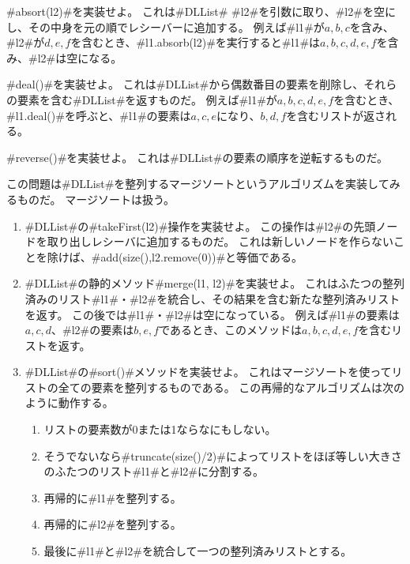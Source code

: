 \begin{exc}
  #absort(l2)#を実装せよ。
  これは#DLList# #l2#を引数に取り、#l2#を空にし、その中身を元の順でレシーバーに追加する。
  例えば#l1#が$a,b,c$を含み、#l2#が$d,e,f$を含むとき、#l1.absorb(l2)#を実行すると#l1#は$a,b,c,d,e,f$を含み、#l2#は空になる。
\end{exc}

\begin{exc}
  #deal()#を実装せよ。
  これは#DLList#から偶数番目の要素を削除し、それらの要素を含む#DLList#を返すものだ。
  例えば#l1#が$a,b,c,d,e,f$を含むとき、#l1.deal()#を呼ぶと、#l1#の要素は$a,c,e$になり、$b,d,f$を含むリストが返される。
\end{exc}

\begin{exc}
  #reverse()#を実装せよ。
  これは#DLList#の要素の順序を逆転するものだ。
\end{exc}

\begin{exc}
  この問題は#DLList#を整列するマージソートというアルゴリズムを実装してみるものだ。
  マージソートは扱う。
  \begin{enumerate}
    \item #DLList#の#takeFirst(l2)#操作を実装せよ。
	この操作は#l2#の先頭ノードを取り出しレシーバに追加するものだ。
	これは新しいノードを作らないことを除けば、#add(size(),l2.remove(0))#と等価である。
    \item #DLList#の静的メソッド#merge(l1, l2)#を実装せよ。
	これはふたつの整列済みのリスト#l1#・#l2#を統合し、その結果を含む新たな整列済みリストを返す。
	この後では#l1#・#l2#は空になっている。
	例えば#l1#の要素は$a,c,d$、#l2#の要素は$b,e,f$であるとき、このメソッドは$a,b,c,d,e,f$を含むリストを返す。
    \item #DLList#の#sort()#メソッドを実装せよ。
	これはマージソートを使ってリストの全ての要素を整列するものである。
	この再帰的なアルゴリズムは次のように動作する。
       \begin{enumerate}
          \item リストの要素数が0または1ならなにもしない。
          \item そうでないなら#truncate(size()/2)#によってリストをほぼ等しい大きさのふたつのリスト#l1#と#l2#に分割する。
          \item 再帰的に#l1#を整列する。
          \item 再帰的に#l2#を整列する。
          \item 最後に#l1#と#l2#を統合して一つの整列済みリストとする。
       \end{enumerate}
  \end{enumerate}
\end{exc}

